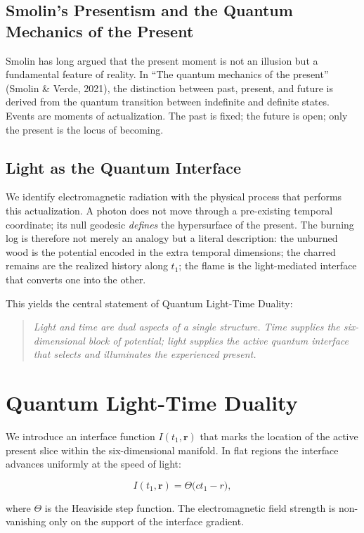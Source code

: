 \documentclass[11pt,a4paper]{article}
\begin{document}
\subsection{Smolin's Presentism and the Quantum Mechanics of the Present}
Smolin has long argued that the present moment is not an illusion but a fundamental feature of reality. In ``The quantum mechanics of the present'' (Smolin \& Verde, 2021), the distinction between past, present, and future is derived from the quantum transition between indefinite and definite states. Events are moments of actualization. The past is fixed; the future is open; only the present is the locus of becoming.

\subsection{Light as the Quantum Interface}
We identify electromagnetic radiation with the physical process that performs this actualization. A photon does not move through a pre-existing temporal coordinate; its null geodesic \textit{defines} the hypersurface of the present. The burning log is therefore not merely an analogy but a literal description: the unburned wood is the potential encoded in the extra temporal dimensions; the charred remains are the realized history along $t_1$; the flame is the light-mediated interface that converts one into the other.

This yields the central statement of Quantum Light-Time Duality:

\begin{quote}
\textit{Light and time are dual aspects of a single structure. Time supplies the six-dimensional block of potential; light supplies the active quantum interface that selects and illuminates the experienced present.}
\end{quote}

\section{Quantum Light-Time Duality}

We introduce an interface function $I(t_1, \mathbf{r})$ that marks the location of the active present slice within the six-dimensional manifold. In flat regions the interface advances uniformly at the speed of light:

\[
I(t_1, \mathbf{r}) = \Theta\bigl(c t_1 - r\bigr),
\]

where $\Theta$ is the Heaviside step function. The electromagnetic field strength is non-vanishing only on the support of the interface gradient.
\end{document}
